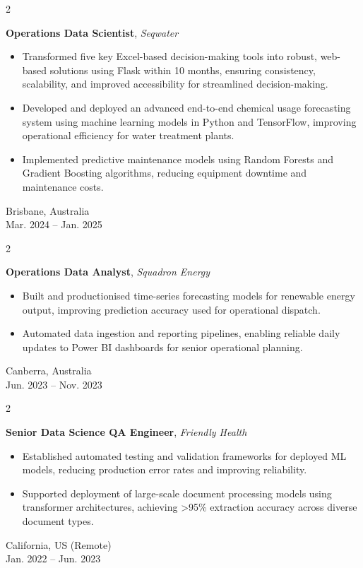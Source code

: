 \documentclass[10pt, letterpaper]{article}
\newenvironment{highlights}{
    \begin{itemize}[
        topsep=0.10 cm,
        parsep=0.10 cm,
        partopsep=0pt,
        itemsep=0pt,
        leftmargin=0.4 cm + 10pt
    ]
}{
    \end{itemize}
} %
\newenvironment{twocolentry}[2][]{
    \onecolentry
    \def\secondColumn{#2}
    \setcolumnwidth{\fill, 4.5 cm}
    \begin{paracol}{2}
}{
    \switchcolumn \raggedleft \secondColumn
    \end{paracol}
    \endonecolentry
} %
\begin{document}
\vspace{0.2 cm}
    \begin{twocolentry}{
        Brisbane, Australia\\
    Mar. 2024 -- Jan. 2025
    }
        \textbf{Operations Data Scientist}, \textit{Seqwater}
    \begin{highlights}
        \item Transformed five key Excel-based decision-making tools into robust, web-based solutions using Flask within 10 months, ensuring consistency, scalability, and improved accessibility for streamlined decision-making.
        \item Developed and deployed an advanced end-to-end chemical usage forecasting system using machine learning models in Python and TensorFlow, improving operational efficiency for water treatment plants.
        \item Implemented predictive maintenance models using Random Forests and Gradient Boosting algorithms, reducing equipment downtime and maintenance costs.
    \end{highlights}
    \end{twocolentry}

    \vspace{0.2 cm}

\begin{twocolentry}{
    Canberra, Australia\\
    Jun. 2023 -- Nov. 2023
}
\textbf{Operations Data Analyst}, \textit{Squadron Energy}
\begin{highlights}
    \item Built and productionised time-series forecasting models for renewable energy output, improving prediction accuracy used for operational dispatch.
    \item Automated data ingestion and reporting pipelines, enabling reliable daily updates to Power BI dashboards for senior operational planning.
\end{highlights}
\end{twocolentry}


    \vspace{0.2 cm}


\begin{twocolentry}{
    California, US (Remote)\\
    Jan. 2022 -- Jun. 2023
}
\textbf{Senior Data Science QA Engineer}, \textit{Friendly Health}
\begin{highlights}
    \item Established automated testing and validation frameworks for deployed ML models, reducing production error rates and improving reliability.
    \item Supported deployment of large-scale document processing models using transformer architectures, achieving >95\% extraction accuracy across diverse document types.
\end{highlights}
\end{twocolentry}
\end{document}
